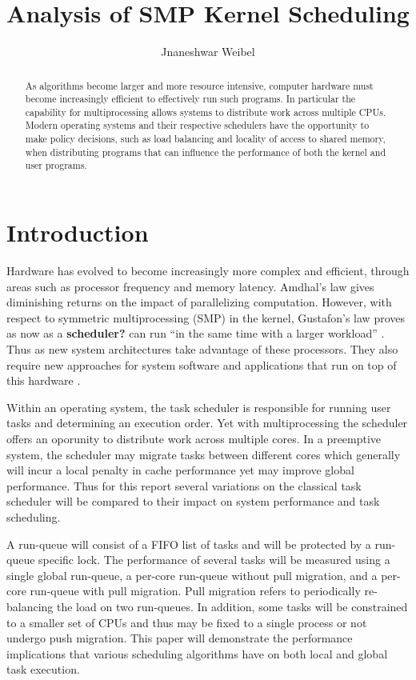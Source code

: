 \documentclass[11pt]{article}
\title{Analysis of SMP Kernel Scheduling}
\author{Jnaneshwar Weibel}
\begin{document}
\maketitle

\begin{abstract}
	As algorithms become larger and more resource intensive, computer hardware must become increasingly efficient to effectively run such programs.  In particular the capability for multiprocessing allows systems to distribute work across multiple CPUs.  Modern operating systems and their respective schedulers have the opportunity to make policy decisions, such as load balancing and locality of access to shared memory, when distributing programs that can influence the performance of both the kernel and user programs.
\end{abstract}



\section{Introduction}
\label{sec:introduction}
Hardware has evolved to become increasingly more complex and efficient, through areas such as processor frequency and memory latency.  Amdhal's law gives diminishing returns on the impact of parallelizing computation.  However, with respect to symmetric multiprocessing (SMP) in the kernel, Gustafon's law proves as now as a \textbf{scheduler?} can run ``in the same time with a larger workload'' \cite{gustafon}.  Thus as new system architectures take advantage of these processors.  They also require new approaches for system software and applications that run on top of this hardware \cite{nitrd}.

Within an operating system, the task scheduler is responsible for running user tasks and determining an execution order.  Yet with multiprocessing the scheduler offers an oporunity to distribute work across multiple cores.  In a preemptive system, the scheduler may migrate tasks between different cores which generally will incur a local penalty in cache performance yet may improve global performance.  Thus for this report several variations on the classical task scheduler will be compared to their impact on system performance and task scheduling.

A run-queue will consist of a FIFO list of tasks and will be protected by a run-queue specific lock.  The performance of several tasks will be measured using a single global run-queue, a per-core run-queue without pull migration, and a per-core run-queue with pull migration.  Pull migration refers to periodically re-balancing the load on two run-queues.  In addition, some tasks will be constrained to a smaller set of CPUs and thus may be fixed to a single process or not undergo push migration.  This paper will demonstrate the performance implications that various scheduling algorithms have on both local and global task execution.
\end{document}
